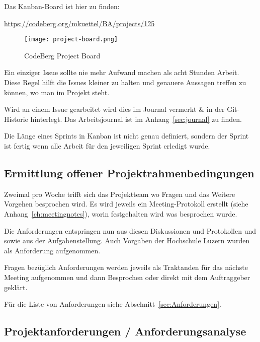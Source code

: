 
Das Kanban-Board ist hier zu finden:

\url{https://codeberg.org/mkuettel/BA/projects/125}



\begin{figure*}[ht]
    \texttt{[image: project-board.png]}
    \caption{CodeBerg Project Board}
    \label{fig:projectboard}
\end{figure*}


Ein einziger Issue sollte nie mehr Aufwand machen als acht Stunden Arbeit. Diese Regel hilft die Issues kleiner zu halten und genauere Aussagen treffen zu können, wo man im Projekt steht.

Wird an einem Issue gearbeitet wird dies im Journal vermerkt \& in der Git-Historie hinterlegt.
Das Arbeitsjournal ist im Anhang~\ref{sec:journal} zu finden.


Die Länge eines Sprints in Kanban ist nicht genau definiert, sondern der Sprint ist fertig wenn alle Arbeit für den jeweiligen Sprint erledigt wurde.

\subsection{Ermittlung offener Projektrahmenbedingungen}
\label{sub:RequirementsEngineering}

Zweimal pro Woche trifft sich das Projektteam wo Fragen und das Weitere
Vorgehen besprochen wird. Es wird jeweils ein Meeting-Protokoll erstellt (siehe
Anhang~\ref{ch:meetingnotes}), worin festgehalten wird was besprochen wurde.

Die Anforderungen entspringen nun aus diesen Diskussionen und Protokollen und sowie aus der Aufgabenstellung.
Auch Vorgaben der Hochschule Luzern wurden als Anforderung aufgenommen.

Fragen bezüglich Anforderungen werden jeweils als Traktanden für das nächste Meeting aufgenommen und dann Besprochen oder direkt mit dem Auftraggeber geklärt.

Für die Liste von Anforderungen siehe Abschnitt~\ref{sec:Anforderungen}.


\subsection{Projektanforderungen / Anforderungsanalyse}
\label{sub:Anforderungen}

